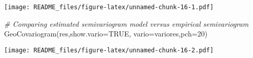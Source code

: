 \documentclass[
]{article}
\newenvironment{Shaded}{\begin{snugshade}}{\end{snugshade}}
\newcommand{\AttributeTok}[1]{\textcolor[rgb]{0.77,0.63,0.00}{#1}}
\newcommand{\CommentTok}[1]{\textcolor[rgb]{0.56,0.35,0.01}{\textit{#1}}}
\newcommand{\ConstantTok}[1]{\textcolor[rgb]{0.00,0.00,0.00}{#1}}
\newcommand{\DecValTok}[1]{\textcolor[rgb]{0.00,0.00,0.81}{#1}}
\newcommand{\FunctionTok}[1]{\textcolor[rgb]{0.00,0.00,0.00}{#1}}
\newcommand{\NormalTok}[1]{#1}
\begin{document}
\texttt{[image: README\_files/figure-latex/unnamed-chunk-16-1.pdf]}

\begin{Shaded}
\begin{Highlighting}[]
\CommentTok{\# Comparing estimated  semivariogram model versus empirical semivariogram }
\FunctionTok{GeoCovariogram}\NormalTok{(res,}\AttributeTok{show.vario=}\ConstantTok{TRUE}\NormalTok{, }\AttributeTok{vario=}\NormalTok{variores,}\AttributeTok{pch=}\DecValTok{20}\NormalTok{)}
\end{Highlighting}
\end{Shaded}

\texttt{[image: README\_files/figure-latex/unnamed-chunk-16-2.pdf]}
\end{document}
